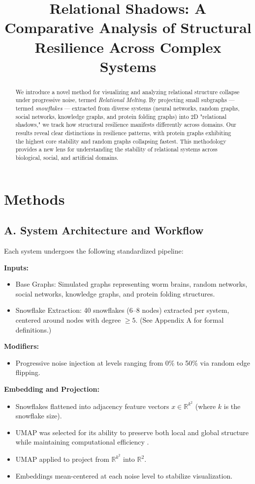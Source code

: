 \documentclass[conference]{IEEEtran}
\title{Relational Shadows: A Comparative Analysis of Structural Resilience Across Complex Systems}
\author{
    \IEEEauthorblockN{Elijah Lucas}
    \IEEEauthorblockA{Independent Researcher \\
    Email: elijah.lucas.research@gmail.com}
}
\begin{document}
\maketitle

\begin{abstract}
We introduce a novel method for visualizing and analyzing relational structure collapse under progressive noise, termed \textit{Relational Melting}. By projecting small subgraphs --- termed \textit{snowflakes} --- extracted from diverse systems (neural networks, random graphs, social networks, knowledge graphs, and protein folding graphs) into 2D "relational shadows," we track how structural resilience manifests differently across domains. Our results reveal clear distinctions in resilience patterns, with protein graphs exhibiting the highest core stability and random graphs collapsing fastest. This methodology provides a new lens for understanding the stability of relational systems across biological, social, and artificial domains.
\end{abstract}

\section{Methods}

\subsection*{\textbf{A. System Architecture and Workflow}}
Each system undergoes the following standardized pipeline:

\textbf{Inputs:}
\begin{itemize}
    \item Base Graphs: Simulated graphs representing worm brains, random networks, social networks, knowledge graphs, and protein folding structures.
    \item Snowflake Extraction: 40 snowflakes (6--8 nodes) extracted per system, centered around nodes with degree $\geq 5$. (See Appendix A for formal definitions.)
\end{itemize}

\textbf{Modifiers:}
\begin{itemize}
    \item Progressive noise injection at levels ranging from 0\% to 50\% via random edge flipping.
\end{itemize}

\textbf{Embedding and Projection:}
\begin{itemize}
    \item Snowflakes flattened into adjacency feature vectors $x \in \mathbb{R}^{k^2}$ (where $k$ is the snowflake size).
    \item UMAP was selected for its ability to preserve both local and global structure while maintaining computational efficiency \cite{umap}.
    \item UMAP applied to project from $\mathbb{R}^{k^2}$ into $\mathbb{R}^{2}$.
    \item Embeddings mean-centered at each noise level to stabilize visualization.
\end{itemize}
\end{document}
